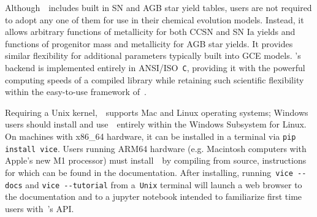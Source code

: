 \documentclass[ms.tex]{subfiles}
\begin{document}
Although~\vice~includes built in SN and AGB star yield tables, users are not
required to adopt any one of them for use in their chemical evolution models.
Instead, it allows arbitrary functions of metallicity for both CCSN and SN Ia
yields and functions of progenitor mass and metallicity for AGB star yields.
It provides similar flexibility for additional parameters typically built into
GCE models.
\vice's backend is implemented entirely in ANSI/ISO~\texttt{C}, providing it
with the powerful computing speeds of a compiled library while retaining such
scientific flexibility within the easy-to-use framework of~\python.
\par
Requiring a Unix kernel,~\vice~supports Mac and Linux operating systems;
Windows users should install and use~\vice~entirely within the Windows
Subsystem for Linux.
On machines with x86\_64 hardware, it can be installed in a terminal via
\texttt{pip install vice}.
Users running ARM64 hardware (e.g. Macintosh computers with Apple's new M1
processor) must install~\vice~by compiling from source,
instructions for which can be found in the documentation.
After installing, running~\texttt{vice -{}-docs} and
\texttt{vice -{}-tutorial} from a~\texttt{Unix} terminal will launch a web
browser to the documentation and to a jupyter notebook intended to familiarize
first time users with~\vice's API.
\end{document}

